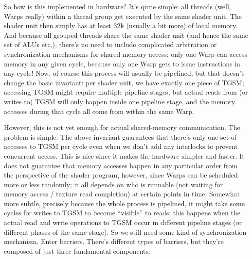 \documentclass[12pt]{article}
\begin{document}
So how is this implemented in hardware? It’s quite simple: all threads (well, Warps really) within a thread group get executed by the same shader unit. The shader unit then simply has at least 32k (usually a bit more) of local memory. And because all grouped threads share the same shader unit (and hence the same set of ALUs etc.), there’s no need to include complicated arbitration or synchronization mechanisms for shared memory access: only one Warp can access memory in any given cycle, because only one Warp gets to issue instructions in any cycle! Now, of course this process will usually be pipelined, but that doesn’t change the basic invariant: per shader unit, we have exactly one piece of TGSM; accessing TGSM might require multiple pipeline stages, but actual reads from (or writes to) TGSM will only happen inside one pipeline stage, and the memory accesses during that cycle all come from within the same Warp.

However, this is not yet enough for actual shared-memory communication. The problem is simple: The above invariant guarantees that there’s only one set of accesses to TGSM per cycle even when we don’t add any interlocks to prevent concurrent access. This is nice since it makes the hardware simpler and faster. It does not guarantee that memory accesses happen in any particular order from the perspective of the shader program, however, since Warps can be scheduled more or less randomly; it all depends on who is runnable (not waiting for memory access / texture read completion) at certain points in time. Somewhat more subtle, precisely because the whole process is pipelined, it might take some cycles for writes to TGSM to become “visible” to reads; this happens when the actual read and write operations to TGSM occur in different pipeline stages (or different phases of the same stage). So we still need some kind of synchronization mechanism. Enter barriers. There’s different types of barriers, but they’re composed of just three fundamental components:
\end{document}
